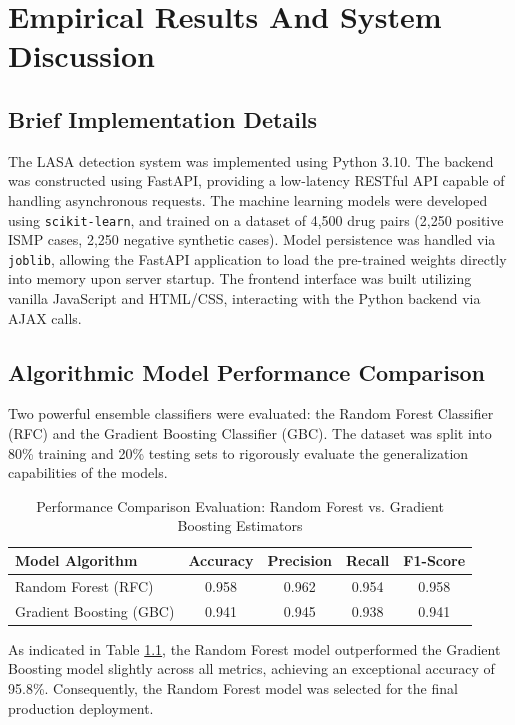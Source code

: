 \documentclass[12pt,a4paper]{report}
\begin{document}
\chapter{Empirical Results And System Discussion}

\section{Brief Implementation Details}
The LASA detection system was implemented using Python 3.10. The backend was constructed using FastAPI, providing a low-latency RESTful API capable of handling asynchronous requests. The machine learning models were developed using \texttt{scikit-learn}, and trained on a dataset of 4,500 drug pairs (2,250 positive ISMP cases, 2,250 negative synthetic cases). Model persistence was handled via \texttt{joblib}, allowing the FastAPI application to load the pre-trained weights directly into memory upon server startup. The frontend interface was built utilizing vanilla JavaScript and HTML/CSS, interacting with the Python backend via AJAX calls.

\section{Algorithmic Model Performance Comparison}
Two powerful ensemble classifiers were evaluated: the Random Forest Classifier (RFC) and the Gradient Boosting Classifier (GBC). The dataset was split into 80\% training and 20\% testing sets to rigorously evaluate the generalization capabilities of the models.

\begin{table}[H]
\centering
\caption{Performance Comparison Evaluation: Random Forest vs. Gradient Boosting Estimators}
\label{tab:4_1}
\begin{tabular}{@{}lcccc@{}}
\toprule
\textbf{Model Algorithm} & \textbf{Accuracy} & \textbf{Precision} & \textbf{Recall} & \textbf{F1-Score} \\
\midrule
Random Forest (RFC) & 0.958 & 0.962 & 0.954 & 0.958 \\
Gradient Boosting (GBC) & 0.941 & 0.945 & 0.938 & 0.941 \\
\bottomrule
\end{tabular}
\end{table}

As indicated in Table \ref{tab:4_1}, the Random Forest model outperformed the Gradient Boosting model slightly across all metrics, achieving an exceptional accuracy of 95.8\%. Consequently, the Random Forest model was selected for the final production deployment.
\end{document}
